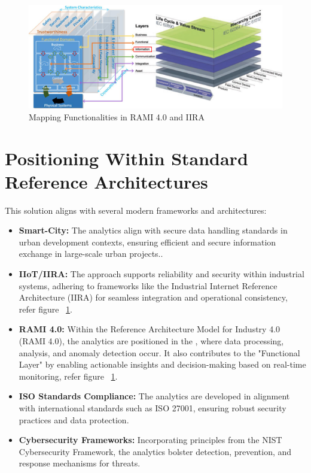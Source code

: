 \begin{figure}
	\begin{center}
		\includegraphics[width=0.7\linewidth]{Images/RAMI_IIRA.png}
		\caption{Mapping Functionalities in RAMI 4.0 and IIRA}
		\label{RAMI_IIRA}
	\end{center}
\end{figure}

\chapter{Positioning Within Standard Reference Architectures}

This solution aligns with several modern frameworks and architectures:

\begin{itemize}
	\item \textbf{Smart-City:} The analytics align with secure data handling standards in urban development contexts, ensuring efficient and secure information exchange in large-scale urban projects..
	\item \textbf{IIoT/IIRA:} The approach supports reliability and security within industrial systems, adhering to frameworks like the Industrial Internet Reference Architecture (IIRA) for seamless integration and operational consistency, refer figure ~\ref{RAMI_IIRA}.
	\item \textbf{RAMI 4.0:} Within the Reference Architecture Model for Industry 4.0 (RAMI 4.0), the analytics are positioned in the , where data processing, analysis, and anomaly detection occur. It also contributes to the "Functional Layer" by enabling actionable insights and decision-making based on real-time monitoring, refer figure ~\ref{RAMI_IIRA}.
	\item \textbf{ISO Standards Compliance:} The analytics are developed in alignment with international standards such as ISO 27001, ensuring robust security practices and data protection.
	\item \textbf{Cybersecurity Frameworks:} Incorporating principles from the NIST Cybersecurity Framework, the analytics bolster detection, prevention, and response mechanisms for threats.
\end{itemize}

